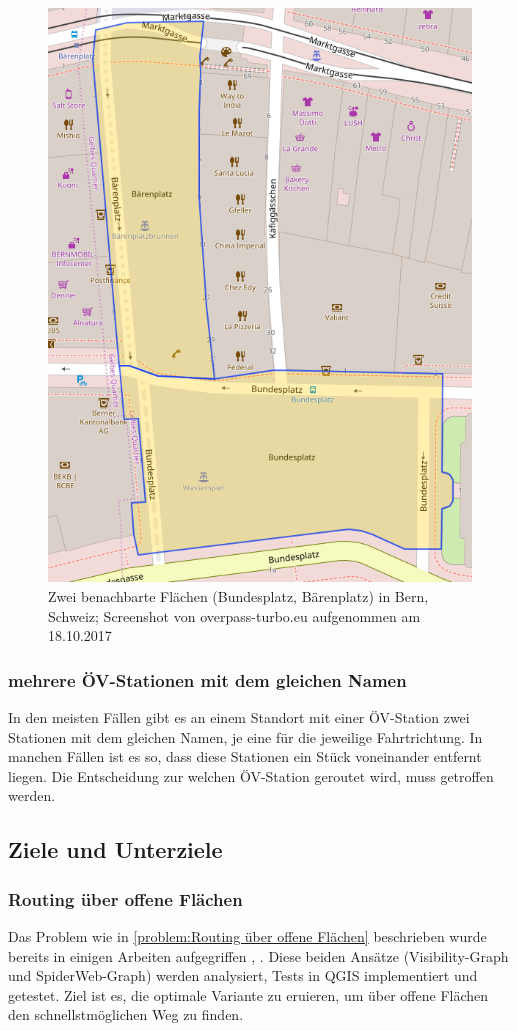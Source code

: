 \begin{figure}[ht]
\centering
\includegraphics[width=0.5\linewidth]{technicalreport/img/bundesplatz_baerenplatz}
\caption[Zwei benachbarte Flächen]{Zwei benachbarte Flächen (Bundesplatz, Bärenplatz) in Bern, Schweiz; Screenshot von overpass-turbo.eu aufgenommen am 18.10.2017}
\label{fig:bundesplatz_baerenplatz}
\end{figure}

\subsubsection{mehrere ÖV-Stationen mit dem gleichen Namen}
\label{problem:mehrere ÖV-Stationen mit dem gleichen Namen}
In den meisten Fällen gibt es an einem Standort mit einer ÖV-Station zwei Stationen mit dem gleichen Namen, je eine für die jeweilige Fahrtrichtung. In manchen Fällen ist es so, dass diese Stationen ein Stück voneinander entfernt liegen. Die Entscheidung zur welchen ÖV-Station geroutet wird, muss getroffen werden.
	
\subsection{Ziele und Unterziele}
\label{Ziele und Unterziele}

\subsubsection{Routing über offene Flächen}
\label{target:Routing über offene Flächen}
Das Problem wie in \ref{problem:Routing über offene Flächen} beschrieben wurde bereits in einigen Arbeiten aufgegriffen \cite{graser_visibility_graph}, \cite{dzafic_spider_web_graph}. Diese beiden Ansätze (Visibility-Graph und SpiderWeb-Graph) werden analysiert, Tests in QGIS implementiert und getestet. Ziel ist es, die optimale Variante zu eruieren, um über offene Flächen den schnellstmöglichen Weg zu finden.

